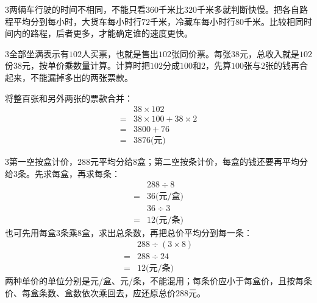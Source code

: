 \documentclass[multi=snippet,border={5bp 20bp 5bp 5bp}]{standalone}
\newenvironment{snippet}[3]{\begin{minipage}{#1bp}\color{answerred}\fontsize{#2}{#3}\selectfont\raggedright}{\end{minipage}}
\begin{document}
\begin{snippet}{505}{11.5}{14}\begin{multicols}{3}\raggedcolumns 两辆车行驶的时间不相同，不能只看\(360\)\allowbreak 千米比\(320\)\allowbreak 千米多就判断快慢。把各自路程平均分到每小时，大货车每小时行\(72\)\allowbreak 千米，冷藏车每小时行\(80\)\allowbreak 千米。比较相同时间内的路程，后者更多，才能确定谁的速度更快。\end{multicols}\end{snippet}
\begin{snippet}{505}{11.5}{14}\begin{multicols}{3}\raggedcolumns 全部坐满表示有\(102\)\allowbreak 人买票，也就是售出\(102\)\allowbreak 张同价票。每张\(38\)\allowbreak 元，总收入就是\(102\)\allowbreak 份\(38\)\allowbreak 元，按单价乘数量计算。计算时把\(102\)\allowbreak 分成\(100\)\allowbreak 和\(2\)\allowbreak ，先算\(100\)\allowbreak 张与\(2\)\allowbreak 张的钱再合起来，不能漏掉多出的两张票款。\par 将整百张和另外两张的票款合并：\[\begin{aligned}&38\times102\\={}&38\times100+38\times2\\={}&3800+76\\={}&3876\text{(元)}\end{aligned}\]\end{multicols}\end{snippet}
\begin{snippet}{505}{11.5}{14}\begin{multicols}{3}\raggedcolumns 第一空按盒计价，\(288\)\allowbreak 元平均分给\(8\)\allowbreak 盒；第二空按条计价，每盒的钱还要再平均分给\(3\)\allowbreak 条。先求每盒，再求每条：\[\begin{aligned}&288\div8\\={}&36\text{(元/盒)}\end{aligned}\]\[\begin{aligned}&36\div3\\={}&12\text{(元/条)}\end{aligned}\]也可先用每盒\(3\)\allowbreak 条乘\(8\)\allowbreak 盒，求出总条数，再把总价平均分到每一条：\[\begin{aligned}&288\div(3\times8)\\={}&288\div24\\={}&12\text{(元/条)}\end{aligned}\]两种单价的单位分别是元/盒、元/条，不能混用；每条价应小于每盒价，且按每条价、每盒条数、盒数依次乘回去，应还原总价\(288\)\allowbreak 元。\end{multicols}\end{snippet}
\end{document}
